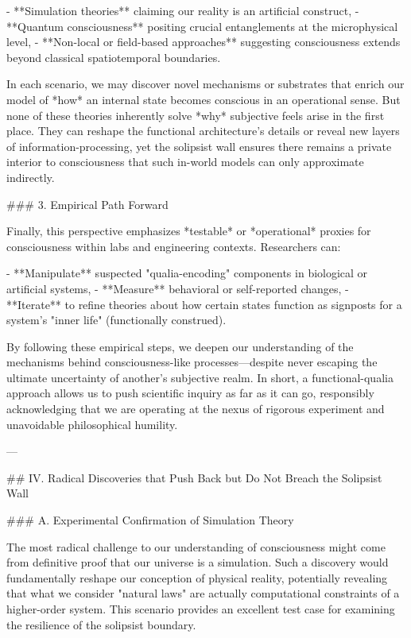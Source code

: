 - **Simulation theories** claiming our reality is an artificial construct,  
- **Quantum consciousness** positing crucial entanglements at the microphysical level,  
- **Non-local or field-based approaches** suggesting consciousness extends beyond classical spatiotemporal boundaries.

In each scenario, we may discover novel mechanisms or substrates that enrich our model of *how* an internal state becomes conscious in an operational sense. But none of these theories inherently solve *why* subjective feels arise in the first place. They can reshape the functional architecture's details or reveal new layers of information-processing, yet the solipsist wall ensures there remains a private interior to consciousness that such in-world models can only approximate indirectly.

### 3. Empirical Path Forward

Finally, this perspective emphasizes *testable* or *operational* proxies for consciousness within labs and engineering contexts. Researchers can:

- **Manipulate** suspected "qualia-encoding" components in biological or artificial systems,  
- **Measure** behavioral or self-reported changes,  
- **Iterate** to refine theories about how certain states function as signposts for a system's "inner life" (functionally construed).

By following these empirical steps, we deepen our understanding of the mechanisms behind consciousness-like processes—despite never escaping the ultimate uncertainty of another's subjective realm. In short, a functional-qualia approach allows us to push scientific inquiry as far as it can go, responsibly acknowledging that we are operating at the nexus of rigorous experiment and unavoidable philosophical humility.


---

## IV. Radical Discoveries that Push Back but Do Not Breach the Solipsist Wall

### A. Experimental Confirmation of Simulation Theory

The most radical challenge to our understanding of consciousness might come from definitive proof that our universe is a simulation. Such a discovery would fundamentally reshape our conception of physical reality, potentially revealing that what we consider "natural laws" are actually computational constraints of a higher-order system. This scenario provides an excellent test case for examining the resilience of the solipsist boundary.

